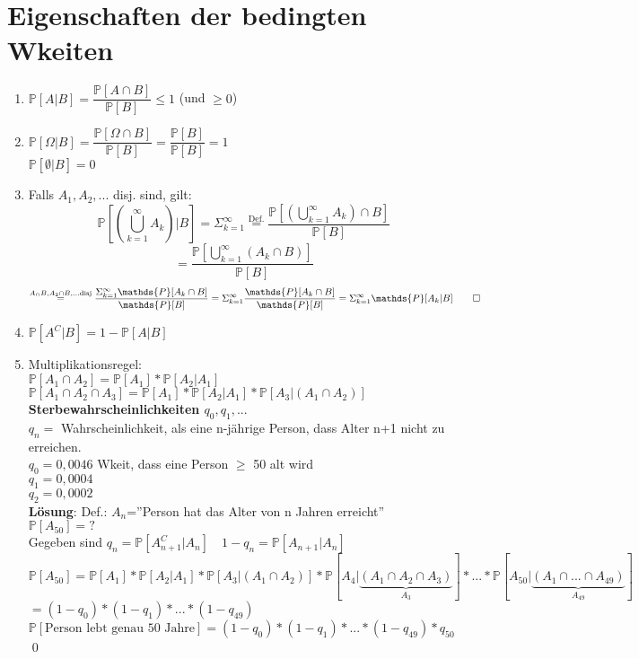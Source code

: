 \section{Eigenschaften der bedingten Wkeiten}
\begin{enumerate}
	\item $\mathds{P}[A \vert B] = \dfrac{\mathds{P}[A \cap B]}{\mathds{P}[B]} \leq 1 $ (und $\geq 0$)
	\item $\mathds{P}[\Omega\vert B] = \dfrac{\mathds{P}[\Omega \cap B]}{\mathds{P}[B]}= \dfrac{\mathds{P}[B]}{\mathds{P}[B]} = 1$
	\\ $\mathds{P}[\emptyset \vert B] = 0$
	\item Falls $A_1,A_2,...$ disj. sind, gilt:
	$$\mathds{P}\left[\left(\bigcup_{k=1}^\infty A_k\right)\vert B\right] = \Sigma_{k=1}^\infty \overset{\text{Def.}}{=} \dfrac{\mathds{P}\left[\left(\bigcup_{k=1}^\infty A_k\right)\cap B\right]}{\mathds{P}[B]}$$
	$$= \dfrac{\mathds{P}\left[\bigcup_{k=1}^\infty(A_k \cap B)\right]}{\mathds{P}[B]}$$
	$$\overset{A_\cap B ,A_2 \cap B,... \text{disj}}{=} \dfrac{\Sigma_{k=1}^\infty \mathds{P}[A_k \cap B]}{\mathds{P}[B]} = \Sigma_{k=1}^\infty \dfrac{\mathds{P}[A_k \cap B]}{\mathds{P}[B]} = \Sigma_{k=1}^\infty \mathds{P}[A_k \vert B] \qed$$
	\item $\mathds{P}[A^C\vert B] = 1 - \mathds{P}[A\vert B]$
	\item Multiplikationsregel:\\$\mathds{P}[A_1\cap A_2] = \mathds{P}[A_1]*\mathds{P}[A_2\vert A_1]$\smallskip\\
	$\mathds{P}[A_1\cap A_2\cap A_3] = \mathds{P}[A_1] * \mathds{P}[A_2 \vert A_1]* \mathds{P}[A_3 \vert (A_1 \cap A_2)]$\smallskip\\
	\textbf{Sterbewahrscheinlichkeiten $q_0,q_1,...$}\\
	$q_n = $ Wahrscheinlichkeit, als eine n-jährige Person, dass Alter n+1 nicht zu erreichen.\smallskip\\
	$q_0 = 0,0046$ \hspace{2cm} Wkeit, dass eine Person $\geq$ 50 alt wird\\
	$q_1 = 0,0004$\\
	$q_2 = 0,0002$\smallskip\\
	\textbf{Lösung}: Def.: $A_n$=''Person hat das Alter von n Jahren erreicht''\\$\mathds{P}[A_{50}] = ?$\medskip\\
	Gegeben sind $q_n = \mathds{P}\left[A_{n+1}^C \vert A_n\right]\quad 1-q_n = \mathds{P}[A_{n+1}\vert A_n]$\\
	$\mathds{P}[A_{50}] = \mathds{P}[A_1]*\mathds{P}[A_2 \vert A_1]*\mathds{P}[A_3\vert (A_1 \cap A_2)]*\mathds{P}[A_4 \vert \underbrace{(A_1 \cap A_2 \cap A_3)}_{A_3}] * ... * \mathds{P}[A_{50}\vert \underbrace{(A_1\cap...\cap A_{49})}_{A_{49}}] $\\ $=(1-q_0)*(1-q_1)*...*(1-q_{49})$\medskip\\
	$\mathds{P}[\text{Person lebt genau 50 Jahre}] =(1-q_0)*(1-q_1)*...*(1-q_{49}) * q_{50}$\qed
\end{enumerate}

